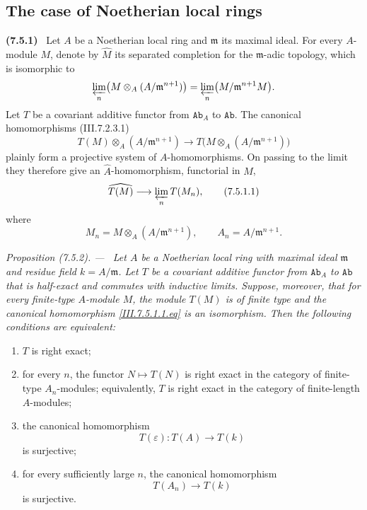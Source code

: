 \documentclass[10pt,oneside]{book}
\newcommand{\cat}[1]{\mathtt{#1}}
\newcommand{\sref}[2][]{(#2)}
\newcommand{\oldpage}[2][]{\setcounter{footnote}{0}\marginpar{\scriptsize\textbf{#1}~|~#2}\ignorespaces}
\newenvironment{env}[1][]{\par\medskip\noindent\textbf{(#1)}\ }{\par}
\newenvironment{proposition}[1][]{\par\medskip\noindent\itshape Proposition (#1). ---\ }{\par}
\begin{document}
\oldpage[III]{190}
\subsection{The case of Noetherian local rings}
\label{subsection:III.7.5}

\begin{env}[7.5.1]
\label{III.7.5.1}
Let $A$ be a Noetherian local ring and $\mathfrak m$ its
maximal ideal.  For every $A$-module $M$, denote by
$\widehat M$ its separated completion for the
$\mathfrak m$-adic topology, which is isomorphic to
\[
  \varprojlim_n
  \bigl(M\otimes_A(A/\mathfrak m^{n+1})\bigr)
  =
  \varprojlim_n
  \bigl(M/\mathfrak m^{n+1}M\bigr).
\]
Let $T$ be a covariant additive functor from $\cat{Ab}_A$ to
$\cat{Ab}$.  The canonical homomorphisms
\sref{III.7.2.3.1}
\[
  T(M)\otimes_A(A/\mathfrak m^{n+1})
  \longrightarrow
  T\bigl(M\otimes_A(A/\mathfrak m^{n+1})\bigr)
\]
plainly form a projective system of $A$-homomorphisms.  On
passing to the limit they therefore give an
$\widehat A$-homomorphism, functorial in $M$,
\[
  \widehat{T(M)}
  \longrightarrow
  \varprojlim_n T(M_n),
  \tag{7.5.1.1}\label{III.7.5.1.1.eq}
\]
where
\[
  M_n=M\otimes_A(A/\mathfrak m^{n+1}),
  \qquad
  A_n=A/\mathfrak m^{n+1}.
\]
\end{env}

\begin{proposition}[7.5.2]
\label{III.7.5.2}
Let $A$ be a Noetherian local ring with maximal ideal
$\mathfrak m$ and residue field $k=A/\mathfrak m$.  Let $T$
be a covariant additive functor from $\cat{Ab}_A$ to
$\cat{Ab}$ that is half-exact and commutes with inductive
limits.  Suppose, moreover, that for every finite-type
$A$-module $M$, the module $T(M)$ is of finite type and the
canonical homomorphism \eqref{III.7.5.1.1.eq} is an
isomorphism.  Then the following conditions are equivalent:
\begin{enumerate}
  \item[(a)] $T$ is right exact;
  \item[(b)] for every $n$, the functor $N\mapsto T(N)$ is
    right exact in the category of finite-type $A_n$-modules;
    equivalently, $T$ is right exact in the category of
    finite-length $A$-modules;
  \item[(c)] the canonical homomorphism
    \[
      T(\varepsilon):T(A)\longrightarrow T(k)
    \]
    is surjective;
  \item[(d)] for every sufficiently large $n$, the canonical
    homomorphism
    \[
      T(A_n)\longrightarrow T(k)
    \]
    is surjective.
\end{enumerate}
\end{proposition}
\end{document}
